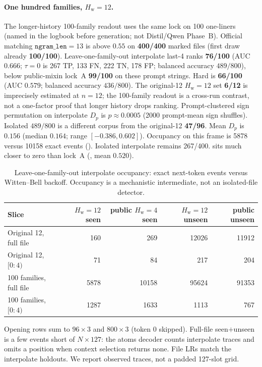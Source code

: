 \documentclass[11pt,a4paper]{article}
\theoremstyle{definition}
\newcommand{\Hw}{H_{\mathrm{w}}}
\begin{document}
\paragraph{One hundred families, $\Hw=12$.}
The longer-history 100-family readout uses the same lock on 100
one-liners (named in the logbook before generation; not Distil/Qwen
Phase~B). Official matching $\mathtt{ngram\_len}=13$ is above $0.55$ on
\textbf{400/400} marked files (first draw already \textbf{100/100}). Leave-one-family-out interpolate last-4
ranks \textbf{76/100} (AUC $0.666$; $\tau=0$ is 267 TP, 133 FN, 222 TN,
178 FP; balanced accuracy $489/800$), below public-mixin lock~A
\textbf{99/100} on these prompt strings. Hard is \textbf{66/100}
(AUC $0.579$; balanced accuracy $436/800$). The original-12 $\Hw=12$ set \textbf{6/12} is
imprecisely estimated at $n=12$; the 100-family readout is a cross-run
contrast, not a one-factor proof that longer history drops ranking.
Prompt-clustered sign permutation on interpolate $D_p$ is
$p\approx 0.0005$ (2000 prompt-mean sign shuffles). Isolated
$489/800$ is a different corpus from the original-12 \textbf{47/96}.
Mean $D_p$ is $0.156$ (median $0.164$; range
$[-0.386,0.602]$). Occupancy on this frame is 5878 versus 10158 exact
events (). Isolated interpolate remains 267/400.
 sits much closer to zero than
lock~A (, mean $0.520$).

\begin{table}[ht]
\centering
\small
\caption{Leave-one-family-out interpolate occupancy: exact next-token
events versus Witten--Bell backoff. Occupancy is a mechanistic
intermediate, not an isolated-file detector.}
\label{tab:occ}
\begin{tabular}{lrrrr}
\toprule
Slice & $\Hw=12$ seen & public $\Hw=4$ seen & $\Hw=12$ unseen & public unseen \\
\midrule
Original 12, full file & 160 & 269 & 12026 & 11912 \\
Original 12, $[0{:}4)$ & 71 & 84 & 217 & 204 \\
100 families, full file & 5878 & 10158 & 95624 & 91353 \\
100 families, $[0{:}4)$ & 1287 & 1633 & 1113 & 767 \\
\bottomrule
\end{tabular}
\end{table}

Opening rows sum to $96\times 3$ and $800\times 3$ (token 0 skipped).
Full-file seen$+$unseen is a few events short of $N\times 127$: the
atoms decoder counts interpolate traces and omits a position when
context selection returns none. File LRs match the interpolate
holdouts. We report observed traces, not a padded 127-slot grid.
\end{document}
